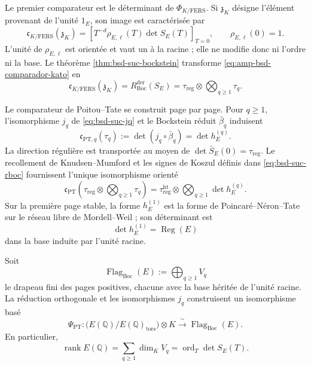 Le premier comparateur est le déterminant de
\(\Phi_{K/\mathrm{FERS}}\). Si \(\mathfrak z_K\) désigne l'élément
provenant de l'unité \(1_E\), son image est caractérisée par
\begin{equation}\label{eq:amp-bsd-comparador-kato}
 \mathfrak c_{K/\mathrm{FERS}}(\mathfrak z_K)
 =\left[T^{-d}\rho_{E,\ell}(T)\det S_E(T)\right]_{T=0},
 \qquad
 \rho_{E,\ell}(0)=1.
\end{equation}
L'unité de \(\rho_{E,\ell}\) est orientée et vaut un à la racine ; elle ne
modifie donc ni l'ordre ni la base. Le théorème
\ref{thm:bsd-suc-bockstein} transforme \eqref{eq:amp-bsd-comparador-kato} en
\begin{equation}\label{eq:amp-bsd-kato-bockstein}
 \mathfrak c_{K/\mathrm{FERS}}(\mathfrak z_K)
 =R_{\mathrm{Boc}}^{\mathrm{der}}(S_E)
 =\tau_{\mathrm{reg}}\otimes\bigotimes_{q\geq1}\tau_q.
\end{equation}

Le comparateur de Poitou--Tate se construit page par page. Pour
\(q\geq1\), l'isomorphisme \(j_q\) de
\eqref{eq:bsd-suc-jq} et le Bockstein réduit
\(\bar\beta_q\) induisent
\begin{equation}\label{eq:amp-bsd-comparador-pt-q}
 \mathfrak c_{\mathrm{PT},q}(\tau_q)
 :=\det\!\left(j_q\circ\bar\beta_q\right)
 =\det h_E^{(q)}.
\end{equation}
La direction régulière est transportée au moyen de
\(\det\bar S_E(0)=\tau_{\mathrm{reg}}\). Le recollement de Knudsen--Mumford et les
signes de Koszul définis dans \eqref{eq:bsd-suc-rboc} fournissent l'unique
isomorphisme orienté
\begin{equation}\label{eq:amp-bsd-comparador-pt}
 \mathfrak c_{\mathrm{PT}}
 \left(\tau_{\mathrm{reg}}\otimes\bigotimes_{q\geq1}\tau_q\right)
 =\tau_{\mathrm{reg}}^{\mathrm{ht}}
  \otimes\bigotimes_{q\geq1}\det h_E^{(q)}.
\end{equation}
Sur la première page stable, la forme \(h_E^{(1)}\) est la forme de
Poincaré--Néron--Tate sur le réseau libre de Mordell--Weil ; son déterminant est
\begin{equation}\label{eq:amp-bsd-regulador-nt}
 \det h_E^{(1)}=\operatorname{Reg}(E)
\end{equation}
dans la base induite par l'unité racine.

\begin{lemma}
\label{lem:amp-bsd-grado-pt}
Soit
\[
 \operatorname{Flag}_{\mathrm{Boc}}(E)
 :=\bigoplus_{q\geq1}V_q
\]
le drapeau fini des pages positives, chacune avec la base héritée de
l'unité racine. La réduction orthogonale et les isomorphismes \(j_q\) construisent un
isomorphisme basé
\begin{equation}\label{eq:amp-bsd-psi-pt}
 \Psi_{\mathrm{PT}}:
 \bigl(E(\mathbb Q)/E(\mathbb Q)_{\mathrm{tors}}\bigr)\otimes K
 \xrightarrow{\ \sim\ }\operatorname{Flag}_{\mathrm{Boc}}(E).
\end{equation}
En particulier,
\begin{equation}\label{eq:amp-bsd-rango-bandera}
 \operatorname{rank}E(\mathbb Q)
 =\sum_{q\geq1}\dim_KV_q
 =\operatorname{ord}_T\det S_E(T).
\end{equation}
\end{lemma}


